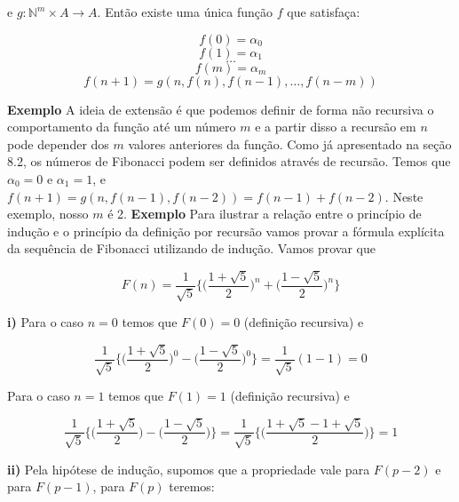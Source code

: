 e $g : \mathbb{N}^m \times A \to A$. Então existe uma única função $f$ que satisfaça:
\begin{center}
    \[ f(0) = \alpha_0 \]
    \[ f(1) = \alpha_1 \]
    \[ \dots \]
    \[ f(m) = \alpha_m \]
    \[ f(n+1) = g(n, f(n), f(n-1), \dots, f(n-m))\]
\end{center} 
\textbf{Exemplo} A ideia de extensão é que podemos definir de forma não recursiva o comportamento da
função até um número $m$ e a partir disso a recursão em $n$ pode depender dos $m$ valores anteriores da 
função. Como já apresentado na seção 8.2, os números de Fibonacci podem ser definidos através de 
recursão. Temos que $\alpha_0 = 0$ e $\alpha_1 = 1$, e $f(n+1) = g(n, f(n-1), f(n-2)) = f(n-1) + f(n-2)$. 
Neste exemplo, nosso $m$ é 2.
\newline \textbf{Exemplo} Para ilustrar a relação entre o princípio de indução e o princípio da definição por recursão
vamos provar a fórmula explícita da sequência de Fibonacci utilizando de indução. Vamos provar que
\begin{center}   
\[ F(n) = \frac{1}{\sqrt{5}}\bigg \{ \Big (\frac{1+\sqrt{5}}{2} \Big )^n + \Big (\frac{1-\sqrt{5}}{2}\Big )^n\bigg \}\]
\end{center}
\textbf{i)} Para o caso $n=0$ temos que $F(0) = 0$ (definição recursiva) e
\begin{center}
    \[ \frac{1}{\sqrt{5}}\bigg \{ \Big(\frac{1+\sqrt{5}}{2}\Big)^0 - \Big(\frac{1-\sqrt{5}}{2}\Big)^0 \bigg \} = \frac{1}{\sqrt{5}}(1 - 1) = 0 \]
\end{center}
Para o caso $n=1$ temos que $F(1) = 1$ (definição recursiva) e
\begin{center}
    \[ \frac{1}{\sqrt{5}} \bigg \{ \Big(\frac{1+\sqrt{5}}{2} \Big) - \Big(\frac{1 -\sqrt{5}}{2} \Big)\bigg \} =\frac{1}{\sqrt{5}} \bigg \{ \Big(\frac{1+\sqrt{5} - 1 + \sqrt{5}}{2} \Big)\bigg \} = 1\]
\end{center}
\textbf{ii)} Pela hipótese de indução, supomos que a propriedade vale para $F(p-2)$ e para $F(p-1)$,
para $F(p)$ teremos:
